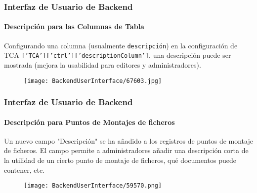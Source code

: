 \begin{frame}[fragile]
	\frametitle{Interfaz de Usuario de Backend}
	\framesubtitle{Descripción para las Columnas de Tabla}

	Configurando una columna (usualmente \texttt{descripción}) en la configuración de TCA \texttt{['TCA']['ctrl']['descriptionColumn']},
	una descripción puede ser mostrada (mejora la usabilidad para editores y administradores).

	\begin{figure}
		\texttt{[image: BackendUserInterface/67603.jpg]}
	\end{figure}

\end{frame}

\begin{frame}[fragile]
	\frametitle{Interfaz de Usuario de Backend}
	\framesubtitle{Descripción para Puntos de Montajes de ficheros}

	Un nuevo campo "Descripción" se ha añadido a los registros de puntos de montaje de ficheros.
	El campo permite a administradores añadir una descripción corta de la utilidad de un cierto punto de montaje de ficheros,
	qué documentos puede contener, etc.

	\begin{figure}
		\texttt{[image: BackendUserInterface/59570.png]}
	\end{figure}

\end{frame}


